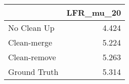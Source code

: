 \begin{tabular}{lr}
\toprule
{} & LFR_mu_20 \\
\midrule
No Clean Up  &     4.424 \\
Clean-merge  &     5.224 \\
Clean-remove &     5.263 \\
Ground Truth &     5.314 \\
\bottomrule
\end{tabular}
